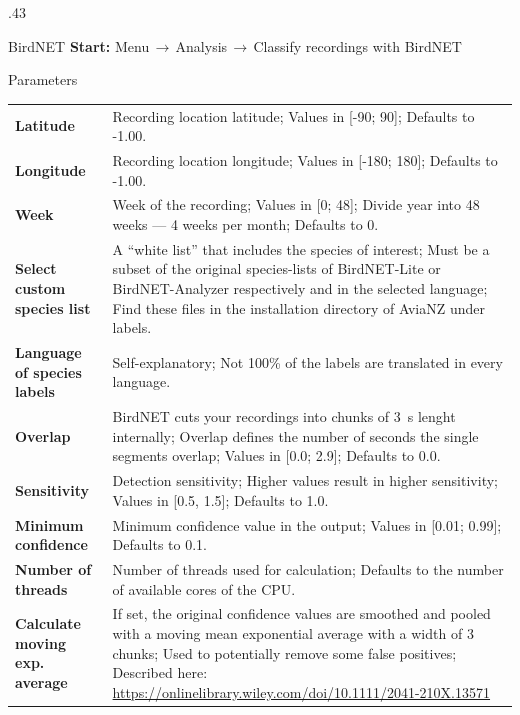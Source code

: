 \documentclass[final,hyperref={pdfpagelabels=false}]{beamer}
\begin{document}
\begin{frame}[fragile]{}
\begin{columns}[t]
      \begin{column}{.43\linewidth}
	\begin{block}{BirdNET}
	\textbf{Start:} Menu$\,\to\,$Analysis$\,\to\,$Classify recordings with BirdNET\\
	\begin{subblock}{Parameters}
{\renewcommand{\arraystretch}{1.2}
	\begin{tabular}{p{7em}p{25em}}
		\textbf{Latitude} & Recording location latitude; Values in [-90; 90]; Defaults to -1.00.\\
\textbf{Longitude} & Recording location longitude; Values in [-180; 180]; Defaults to -1.00.\\
	\textbf{Week} & Week of the recording; Values in [0; 48]; Divide year into 48 weeks — 4 weeks per month; Defaults to 0.\\
\textbf{Select custom species list} & A ``white list'' that includes the species of interest; Must be a subset of the original species-lists of BirdNET-Lite or BirdNET-Analyzer respectively and in the selected language; Find these files in the installation directory of AviaNZ under labels.\\ 
\textbf{Language of species labels} & Self-explanatory; Not 100\% of the labels are translated in every language.\\
\textbf{Overlap} & BirdNET cuts your recordings into chunks of \SI{3}{\second} lenght internally; Overlap defines the number of seconds the single segments overlap; Values in [0.0; 2.9]; Defaults to 0.0.\\
\textbf{Sensitivity} & Detection sensitivity; Higher values result in higher sensitivity; Values in [0.5, 1.5]; Defaults to 1.0.\\
\textbf{Minimum confidence} & Minimum confidence value in the output; Values in [0.01; 0.99]; Defaults to 0.1.\\
\textbf{Number of threads} & Number of threads used for calculation; Defaults to the number of available cores of the CPU.\\
\textbf{Calculate moving exp. average} & If set, the original confidence values are smoothed and pooled with a moving mean exponential average with a width of 3 chunks; Used to potentially remove some false positives; Described here: \url{https://onlinelibrary.wiley.com/doi/10.1111/2041-210X.13571}\\

\end{tabular}}
\end{subblock}
\end{block}
\end{column}
\end{columns}
\end{frame}
\end{document}

